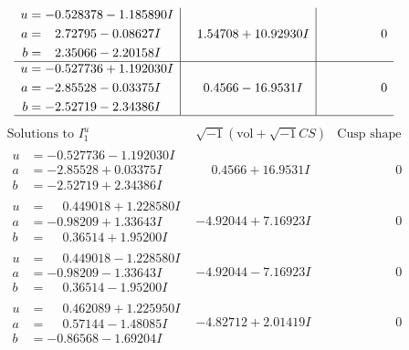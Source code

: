 \documentclass[1p]{elsarticle_modified}
\theoremstyle{definition}
\newcommand{\I}{\sqrt{-1}}
\begin{document}
$$\begin{array}{c|c|c}
\begin{aligned}
u &= -0.528378 - 1.185890 I \\
a &= \phantom{-}2.72795 - 0.08627 I \\
b &= \phantom{-}2.35066 - 2.20158 I\end{aligned}
 & \phantom{-}1.54708 + 10.92930 I & \phantom{-0.000000 } 0 \\ \hline\begin{aligned}
u &= -0.527736 + 1.192030 I \\
a &= -2.85528 - 0.03375 I \\
b &= -2.52719 - 2.34386 I\end{aligned}
 & \phantom{-}0.4566 - 16.9531 I & \phantom{-0.000000 } 0\\
 \hline 
 \end{array}$$\newpage$$\begin{array}{c|c|c}  
\text{Solutions to }I^u_{1}& \I (\text{vol} + \sqrt{-1}CS) & \text{Cusp shape}\\
 \hline 
\begin{aligned}
u &= -0.527736 - 1.192030 I \\
a &= -2.85528 + 0.03375 I \\
b &= -2.52719 + 2.34386 I\end{aligned}
 & \phantom{-}0.4566 + 16.9531 I & \phantom{-0.000000 } 0 \\ \hline\begin{aligned}
u &= \phantom{-}0.449018 + 1.228580 I \\
a &= -0.98209 + 1.33643 I \\
b &= \phantom{-}0.36514 + 1.95200 I\end{aligned}
 & -4.92044 + 7.16923 I & \phantom{-0.000000 } 0 \\ \hline\begin{aligned}
u &= \phantom{-}0.449018 - 1.228580 I \\
a &= -0.98209 - 1.33643 I \\
b &= \phantom{-}0.36514 - 1.95200 I\end{aligned}
 & -4.92044 - 7.16923 I & \phantom{-0.000000 } 0 \\ \hline\begin{aligned}
u &= \phantom{-}0.462089 + 1.225950 I \\
a &= \phantom{-}0.57144 - 1.48085 I \\
b &= -0.86568 - 1.69204 I\end{aligned}
 & -4.82712 + 2.01419 I & \phantom{-0.000000 } 0 \\ \hline\begin{aligned}

\end{aligned}
\end{array}$$
\end{document}
